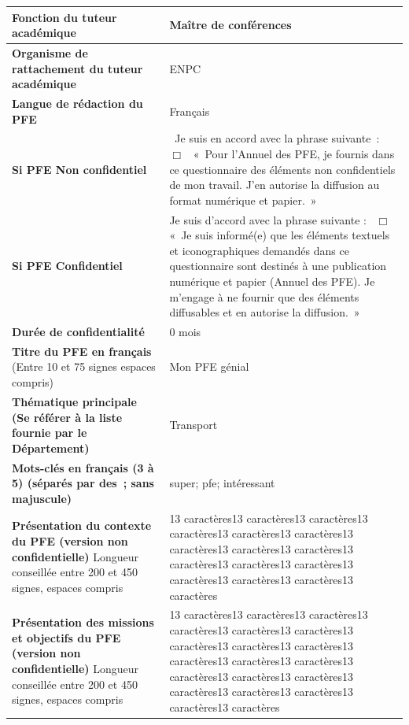 \documentclass[12pt,a4paper]{article}
\begin{document}
\begin{longtable}{|p{7cm}|p{9cm}|}
    \textbf{Fonction du tuteur académique} & Maître de conférences \\ \hline
    \textbf{Organisme de rattachement du tuteur académique} & ENPC \\ \hline
    \textbf{Langue de rédaction du PFE} & Français \\ \hline
    \textbf{Si PFE Non confidentiel} & ~Je suis en accord avec la phrase suivante :~$\Box$~ \newline\newline« Pour l'Annuel des PFE, je fournis dans ce questionnaire des éléments non confidentiels de mon travail. J'en autorise la diffusion au format numérique et papier. »\\ \hline
    \textbf{Si PFE Confidentiel} &  Je suis d'accord avec la phrase suivante : ~$\Box$~ \newline\newline « Je suis informé(e) que les éléments textuels et iconographiques demandés dans ce questionnaire sont destinés à une publication numérique et papier (Annuel des PFE). Je m'engage à ne fournir que des éléments diffusables et en autorise la diffusion. » \\ \hline
    \textbf{Durée de confidentialité} & 0 mois \\ \hline
    \textbf{Titre du PFE en français} (Entre 10 et 75 signes espaces compris) & Mon PFE génial \\ \hline
    \textbf{Thématique principale \newline\newline 
(Se référer à la liste fournie par le Département)} & Transport \\ \hline
    \textbf{Mots-clés en français (3 à 5) (séparés par des ; sans majuscule)} & super; pfe; intéressant \\ \hline
    \textbf{Présentation du contexte du PFE (version non confidentielle)} Longueur conseillée entre 200 et 450 signes, espaces compris
 & 13 caractères13 caractères13 caractères13 caractères13 caractères13 caractères13 caractères13 caractères13 caractères13 caractères13 caractères13 caractères13 caractères13 caractères13 caractères13 caractères \\ \hline
    \textbf{Présentation des missions et objectifs du PFE (version non confidentielle)} Longueur conseillée entre 200 et 450 signes, espaces compris & 13 caractères13 caractères13 caractères13 caractères13 caractères13 caractères13 caractères13 caractères13 caractères13 caractères13 caractères13 caractères13 caractères13 caractères13 caractères13 caractères13 caractères13 caractères13 caractères13 caractères \\ \hline

\end{longtable}
\end{document}
